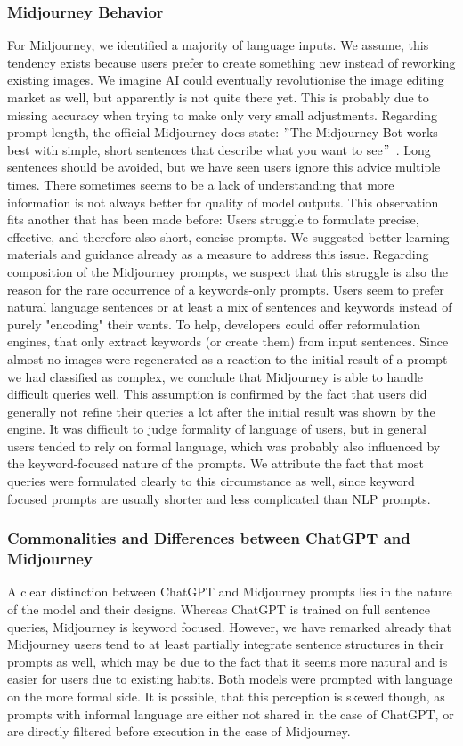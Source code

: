 \subsubsection{Midjourney Behavior}
For Midjourney, we identified a majority of language inputs.
We assume, this tendency exists because users prefer to create something new instead
of reworking existing images.
We imagine AI could eventually revolutionise the image editing market as well, but apparently is
not quite there yet.
This is probably due to missing accuracy when trying to make only very small
adjustments.
Regarding prompt length, the official Midjourney docs state: \("\)The Midjourney Bot works best with
simple, short sentences that describe what you want to see\("\)~\cite{midjourney_documentation_2023}.
Long sentences should be avoided, but we have seen users ignore this advice multiple times.
There sometimes seems to be a lack of understanding that more information is not
always better for quality of model outputs.
This observation fits another that has been made before:
Users struggle to formulate precise, effective, and therefore also short, concise prompts.
We suggested better learning materials and guidance already as a measure to address this issue.
Regarding composition of the Midjourney prompts, we suspect that this struggle is also the reason
for the rare occurrence of a keywords-only prompts.
Users seem to prefer natural language sentences or at least a mix of sentences and keywords
instead of purely "encoding" their wants.
To help, developers could offer reformulation engines, that only extract keywords (or create them)
from input sentences.
Since almost no images were regenerated as a reaction to the initial result of a prompt
we had classified as complex, we conclude that Midjourney is able to handle difficult queries well.
This assumption is confirmed by the fact that users did generally not refine their queries a lot
after the initial result was shown by the engine.
It was difficult to judge formality of language of users, but in general users tended to rely on
formal language, which was probably also influenced by the keyword-focused nature of the prompts.
We attribute the fact that most queries were formulated clearly to this circumstance as well,
since keyword focused prompts are usually shorter and less complicated than NLP prompts.

\subsubsection{Commonalities and Differences between ChatGPT and Midjourney}
A clear distinction between ChatGPT and Midjourney prompts lies in the nature of the model and
their designs.
Whereas ChatGPT is trained on full sentence queries, Midjourney is keyword focused.
However, we have remarked already that Midjourney users tend to at least partially integrate
sentence structures in their prompts as well, which may be due to the fact that it seems more
natural and is easier for users due to existing habits.
Both models were prompted with language on the more formal side.
It is possible, that this perception is skewed though, as prompts with informal language are
either not shared in the case of ChatGPT, or are directly filtered before execution in the case
of Midjourney.

